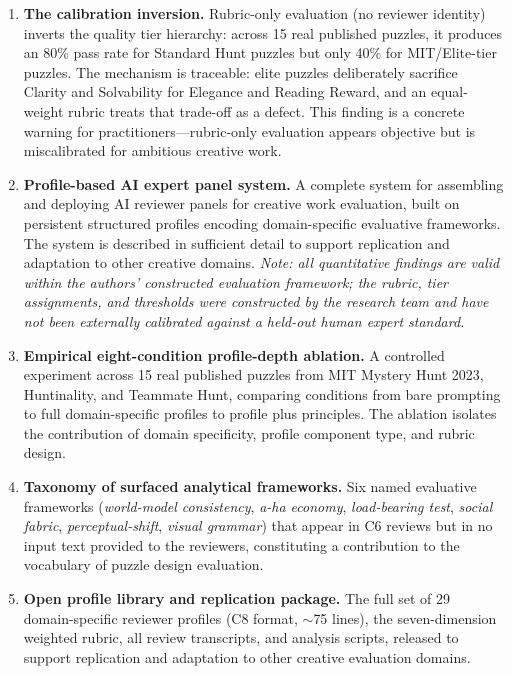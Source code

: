 \begin{enumerate}

\item \textbf{The calibration inversion.} Rubric-only evaluation (no reviewer identity)
inverts the quality tier hierarchy: across 15 real published puzzles, it produces an 80\%
pass rate for Standard Hunt puzzles but only 40\% for MIT/Elite-tier puzzles. The mechanism
is traceable: elite puzzles deliberately sacrifice Clarity and Solvability for Elegance and
Reading Reward, and an equal-weight rubric treats that trade-off as a defect. This finding
is a concrete warning for practitioners---rubric-only evaluation appears objective but is
miscalibrated for ambitious creative work.

\item \textbf{Profile-based AI expert panel system.} A complete system for assembling and
deploying AI reviewer panels for creative work evaluation, built on persistent structured
profiles encoding domain-specific evaluative frameworks. The system is described in
sufficient detail to support replication and adaptation to other creative domains.
\emph{Note: all quantitative findings are valid within the authors' constructed evaluation
framework; the rubric, tier assignments, and thresholds were constructed by the research
team and have not been externally calibrated against a held-out human expert standard.}

\item \textbf{Empirical eight-condition profile-depth ablation.} A controlled experiment
across 15 real published puzzles from MIT Mystery Hunt 2023, Huntinality, and Teammate Hunt,
comparing conditions from bare prompting to full domain-specific profiles to profile plus
principles. The ablation isolates the contribution of domain specificity, profile
component type, and rubric design.

\item \textbf{Taxonomy of surfaced analytical frameworks.} Six named evaluative frameworks
(\emph{world-model consistency}, \emph{a-ha economy}, \emph{load-bearing test},
\emph{social fabric}, \emph{perceptual-shift}, \emph{visual grammar}) that appear in
C6 reviews but in no input text provided to the reviewers, constituting a contribution to
the vocabulary of puzzle design evaluation.

\item \textbf{Open profile library and replication package.} The full set of 29
domain-specific reviewer profiles (C8 format, $\sim$75 lines), the seven-dimension weighted
rubric, all review transcripts, and analysis scripts, released to support replication and
adaptation to other creative evaluation domains.

\end{enumerate}


